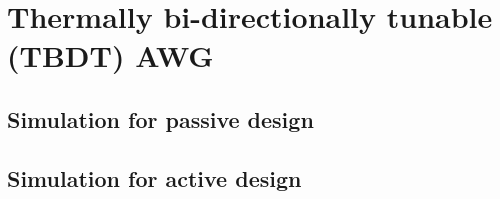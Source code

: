 \clearpage
\setlength{\parskip}{0pt}\chapter{Thermally bi-directionally tunable (TBDT) AWG} \label{chap:3}
    \lipsum

\section{Simulation for passive design} \label{sec:3.1}
    \lipsum

\section{Simulation for active design} \label{sec:3.2}
    \lipsum


